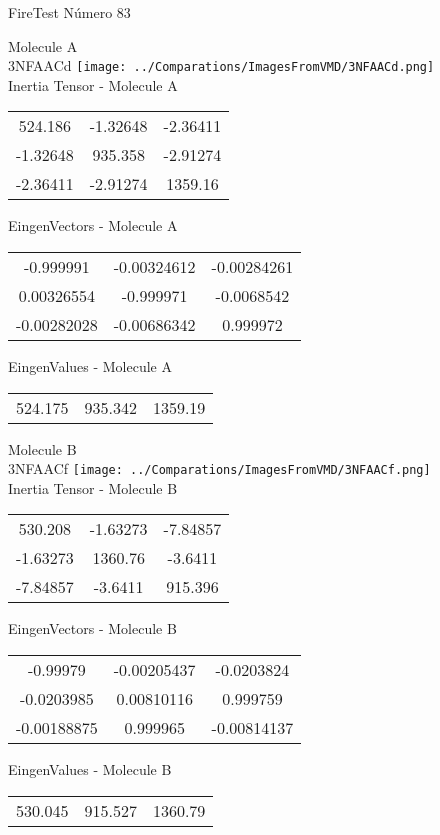 \vtab[-2cm]
\begin{center}
{\large FireTest \tab Número 83}
\end{center}
\begin{multicols}{2}
\begin{center}

Molecule A \\ 
3NFAACd
\texttt{[image: ../Comparations/ImagesFromVMD/3NFAACd.png]}
\\
Inertia Tensor - Molecule A \\
\vtab

\begin{tabular}{|c c c|}
524.186	 & 	-1.32648	 & 	-2.36411	 \\
-1.32648	 & 	935.358	 & 	-2.91274	 \\
-2.36411	 & 	-2.91274	 & 	1359.16
\end{tabular}

\vtab
 EingenVectors - Molecule A     \\
\vtab
\begin{tabular}{|c c c|}
-0.999991	 & 	-0.00324612	 & 	-0.00284261	 \\
0.00326554	 & 	-0.999971	 & 	-0.0068542	 \\
-0.00282028	 & 	-0.00686342	 & 	0.999972
\end{tabular}

\vtab
 EingenValues - Molecule A     \\
\vtab
\begin{tabular}{|c c c|}
524.175	 & 	935.342	 & 	1359.19	 \\
\end{tabular}
\columnbreak

Molecule B \\ 
3NFAACf
\texttt{[image: ../Comparations/ImagesFromVMD/3NFAACf.png]}
\\
Inertia Tensor - Molecule B \\
\vtab

\begin{tabular}{|c c c|}
530.208	 & 	-1.63273	 & 	-7.84857	 \\
-1.63273	 & 	1360.76	 & 	-3.6411	 \\
-7.84857	 & 	-3.6411	 & 	915.396
\end{tabular}

\vtab
 EingenVectors - Molecule B     \\
\vtab
\begin{tabular}{|c c c|}
-0.99979	 & 	-0.00205437	 & 	-0.0203824	 \\
-0.0203985	 & 	0.00810116	 & 	0.999759	 \\
-0.00188875	 & 	0.999965	 & 	-0.00814137
\end{tabular}

\vtab
 EingenValues - Molecule B     \\
\vtab
\begin{tabular}{|c c c|}
530.045	 & 	915.527	 & 	1360.79	 \\
\end{tabular}

\end{center}
\end{multicols}
